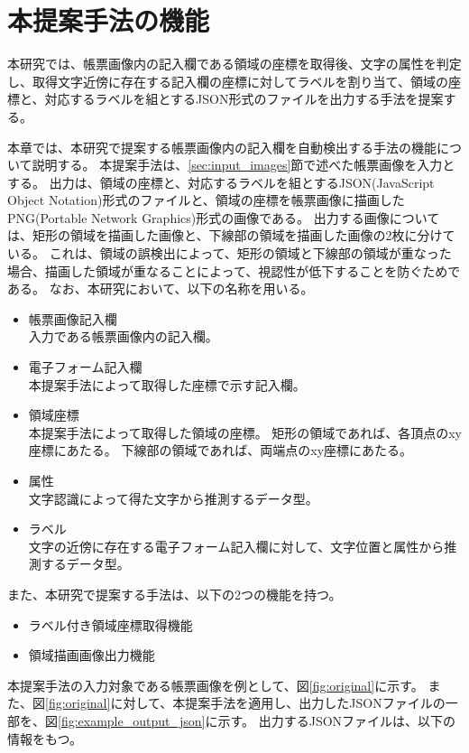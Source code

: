 \chapter{本提案手法の機能}\label{cha:Function}
本研究では、帳票画像内の記入欄である領域の座標を取得後、文字の属性を判定し、取得文字近傍に存在する記入欄の座標に対してラベルを割り当て、領域の座標と、対応するラベルを組とするJSON形式のファイルを出力する手法を提案する。

本章では、本研究で提案する帳票画像内の記入欄を自動検出する手法の機能について説明する。
本提案手法は、\ref{sec:input_images}節で述べた帳票画像を入力とする。
出力は、領域の座標と、対応するラベルを組とするJSON(JavaScript Object Notation)形式のファイルと、領域の座標を帳票画像に描画したPNG(Portable Network Graphics)形式の画像である。
出力する画像については、矩形の領域を描画した画像と、下線部の領域を描画した画像の2枚に分けている。
これは、領域の誤検出によって、矩形の領域と下線部の領域が重なった場合、描画した領域が重なることによって、視認性が低下することを防ぐためである。
なお、本研究において、以下の名称を用いる。

\begin{itemize}
    \item 帳票画像記入欄\\
          入力である帳票画像内の記入欄。
    \item 電子フォーム記入欄\\
          本提案手法によって取得した座標で示す記入欄。
    \item 領域座標\\
          本提案手法によって取得した領域の座標。
          矩形の領域であれば、各頂点のxy座標にあたる。
          下線部の領域であれば、両端点のxy座標にあたる。
    \item 属性\\
          文字認識によって得た文字から推測するデータ型。
    \item ラベル\\
          文字の近傍に存在する電子フォーム記入欄に対して、文字位置と属性から推測するデータ型。
\end{itemize}

また、本研究で提案する手法は、以下の2つの機能を持つ。

\begin{itemize}
    \item ラベル付き領域座標取得機能
    \item 領域描画画像出力機能
\end{itemize}

本提案手法の入力対象である帳票画像を例として、図\ref{fig:original}に示す。
また、図\ref{fig:original}に対して、本提案手法を適用し、出力したJSONファイルの一部を、図\ref{fig:example_output_json}に示す。
出力するJSONファイルは、以下の情報をもつ。


